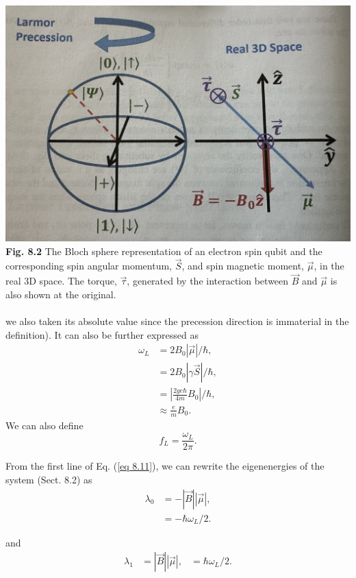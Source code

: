 \documentclass{article}
\begin{document}
\includegraphics[scale=0.35]{Fig.8.2.jpeg}\\
\textbf{Fig. 8.2} The Bloch sphere representation of an electron spin qubit and the corresponding spin
angular momentum, $\vec{S}$, and spin magnetic moment, $\vec{\mu}$, in the real 3D space. The torque, $\vec{\tau}$,
generated by the interaction between $\vec{B}$ and $\vec{\mu}$ is also shown at the original.
\\\\
we also taken its absolute value since the precession direction is immaterial
in the definition). It can also be further expressed as 
\begin{align*}\label{eq 8.11}
    \omega_L&=2B_0|\vec{\mu}|/\hbar,\\
    &=2B_0|\gamma\vec{S}|/\hbar,\\
    &=\left|\frac{2ge\hbar}{4m}B_0\right|/\hbar,\\
    &\approx\frac{e}{m}B_0.\tag{8.11}
\end{align*}
We can also define
\begin{equation} \label{eq 8.12}
    f_L=\frac{\omega_L}{2\pi}. \tag{8.12}
\end{equation}

From the first line of Eq. (\ref{eq 8.11}), we can rewrite the eigenenergies of the system
(Sect. 8.2) as
\begin{align*}\label{eq 8.13}
    \lambda_0&=-|\vec{B}||\vec{\mu}|,\\
    &=-\hbar\omega_L/2.\tag{8.13}
\end{align*}

and
\begin{align*}\label{eq 8.14}
    \lambda_1&=|\vec{B}||\vec{\mu}|,
    &=\hbar\omega_L/2.\tag{8.14}
\end{align*}
\end{document}
